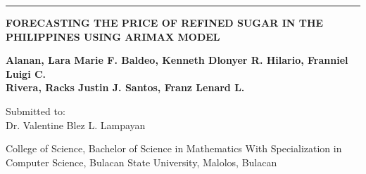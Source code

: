 \documentclass[11pt]{article}
\begin{document}
\begin{titlepage}
\begin{center}
\begin{center}
\begin{minipage}{0.2\textwidth}
            \end{minipage}
        \end{center}
        \vspace{1em}
        \hrule
        \vspace{2em}

        {\LARGE \bfseries \MakeUppercase{Forecasting the Price of  Refined Sugar in the Philippines using ARIMAX Model}\\}  
        \vspace{2em}

        { \bfseries
        Alanan, Lara Marie F. \quad 
        Baldeo, Kenneth Dlonyer R.\quad
        Hilario, Franniel Luigi C. \\
        Rivera, Racks Justin J.\quad
        Santos, Franz Lenard L.
        }
        \vspace{2em}

        {
            Submitted to: \\
            Dr. Valentine Blez L. Lampayan
        }

        \vspace{2em}

        { 
            \small
            College of Science, Bachelor of Science in Mathematics
            With Specialization in Computer Science,
            Bulacan State University, Malolos, Bulacan
        }

        \vspace{3em}
   
        \begin{abstract}
            \onehalfspacing
            This study forecasts the monthly retail price of refined sugar in the Philippines using the ARIMAX model, with the inclusion of exogenous variables such as climate conditions, sugar production and withdrawals, exchange rate, and inflation. Using data from 2014 to 2024, the optimal model, ARIMAX(1,1,1), achieved a Mean Absolute Percentage Error (MAPE) of 5.21 percent, indicating high accuracy. The Short-term forecasts for early 2025 showed a MAPE of just 0.51 percent when compared to actual prices. The three-year forecast (2025-2027) suggests a stable price trend with minor fluctuations. Additionally, the results shows that statistical significance doesn't always align with predictive value. These results provide useful insights for policymakers, businesses, and the agricultural sector in planning and decision-making related to sugar pricing and supply management. 
        \end{abstract}
        
    \end{center}
\end{titlepage}
\end{document}
